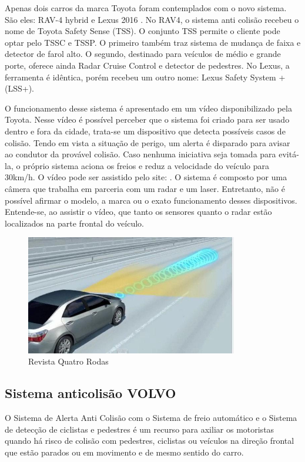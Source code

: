 Apenas dois carros da marca Toyota foram contemplados com o novo sistema. São eles: RAV-4 hybrid e Lexus 2016 \cite{3comper}. No RAV4, o sistema anti colisão recebeu o nome de Toyota Safety Sense (TSS). O conjunto TSS permite o cliente pode optar pelo TSSC e TSSP. O primeiro também traz sistema de mudança de faixa e detector de farol alto. O segundo, destinado para veículos de médio e grande porte, oferece ainda Radar Cruise Control e detector de pedestres. No Lexus, a ferramenta é idêntica, porém recebeu um outro nome: Lexus Safety System + (LSS+).

O funcionamento desse sistema é apresentado em um vídeo disponibilizado pela Toyota. Nesse vídeo é possível perceber que o sistema foi criado para ser usado dentro e fora da cidade, trata-se um dispositivo que detecta possíveis casos de colisão. Tendo em vista a situação de perigo, um alerta é disparado para avisar ao condutor da provável colisão. Caso nenhuma iniciativa seja tomada para evitá-la, o próprio sistema aciona os freios e reduz a velocidade do veículo para 30km/h. O vídeo pode ser assistido pelo site: \cite{4comper}. O sistema é composto por uma câmera que trabalha em parceria com um radar e um laser. Entretanto, não é possível afirmar o modelo, a marca ou o exato funcionamento desses dispositivos. Entende-se, ao assistir o vídeo, que tanto os sensores quanto o radar estão localizados na parte frontal do veículo.

\begin{figure}[h]
  \centering
  \includegraphics[width=350px, scale=0.5]{figuras/sinal_componentes}
  \caption{Revista Quatro Rodas}
\label{fig:sinal_componentes}
\end{figure}

\subsection{Sistema anticolisão VOLVO}

O Sistema de Alerta Anti Colisão com o Sistema de freio automático e o Sistema de detecção de ciclistas e pedestres é um recurso para axiliar os motoristas quando há risco de colisão com pedestres, ciclistas ou veículos na direção frontal que estão parados ou em movimento e de mesmo sentido do carro. 

